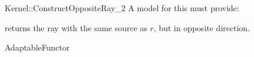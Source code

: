 \begin{ccRefFunctionObjectConcept}{Kernel::ConstructOppositeRay_2}
A model for this must provide:


{returns the ray with the same source as $r$, but in opposite direction.}

\ccRefines
AdaptableFunctor

\ccSeeAlso
{} \\

\end{ccRefFunctionObjectConcept}
